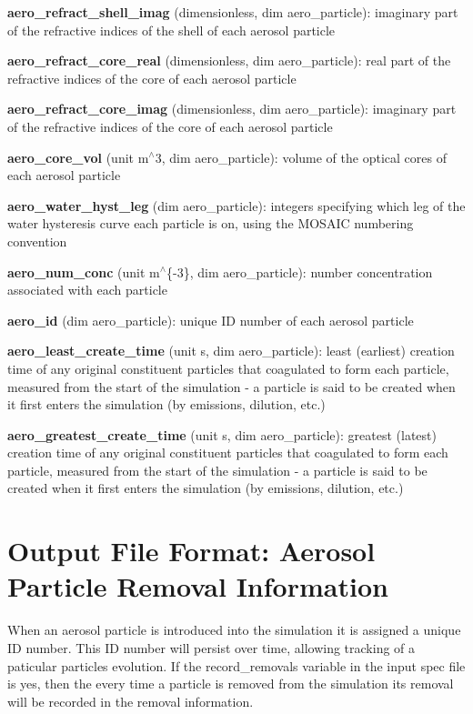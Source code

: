 \begin{DoxyItemize}
\item {\bfseries aero\+\_\+refract\+\_\+shell\+\_\+imag} (dimensionless, dim {\ttfamily aero\+\_\+particle})\+: imaginary part of the refractive indices of the shell of each aerosol particle
\item {\bfseries aero\+\_\+refract\+\_\+core\+\_\+real} (dimensionless, dim {\ttfamily aero\+\_\+particle})\+: real part of the refractive indices of the core of each aerosol particle
\item {\bfseries aero\+\_\+refract\+\_\+core\+\_\+imag} (dimensionless, dim {\ttfamily aero\+\_\+particle})\+: imaginary part of the refractive indices of the core of each aerosol particle
\item {\bfseries aero\+\_\+core\+\_\+vol} (unit m$^\wedge$3, dim {\ttfamily aero\+\_\+particle})\+: volume of the optical cores of each aerosol particle
\item {\bfseries aero\+\_\+water\+\_\+hyst\+\_\+leg} (dim {\ttfamily aero\+\_\+particle})\+: integers specifying which leg of the water hysteresis curve each particle is on, using the M\+O\+S\+A\+IC numbering convention
\item {\bfseries aero\+\_\+num\+\_\+conc} (unit m$^\wedge$\{-\/3\}, dim {\ttfamily aero\+\_\+particle})\+: number concentration associated with each particle
\item {\bfseries aero\+\_\+id} (dim {\ttfamily aero\+\_\+particle})\+: unique ID number of each aerosol particle
\item {\bfseries aero\+\_\+least\+\_\+create\+\_\+time} (unit s, dim {\ttfamily aero\+\_\+particle})\+: least (earliest) creation time of any original constituent particles that coagulated to form each particle, measured from the start of the simulation -\/ a particle is said to be created when it first enters the simulation (by emissions, dilution, etc.)
\item {\bfseries aero\+\_\+greatest\+\_\+create\+\_\+time} (unit s, dim {\ttfamily aero\+\_\+particle})\+: greatest (latest) creation time of any original constituent particles that coagulated to form each particle, measured from the start of the simulation -\/ a particle is said to be created when it first enters the simulation (by emissions, dilution, etc.) 
\end{DoxyItemize}\hypertarget{output_format_aero_removed}{}\section{Output File Format\+: Aerosol Particle Removal Information}\label{output_format_aero_removed}
When an aerosol particle is introduced into the simulation it is assigned a unique ID number. This ID number will persist over time, allowing tracking of a paticular particle\textquotesingle{}s evolution. If the {\ttfamily record\+\_\+removals} variable in the input spec file is {\ttfamily yes}, then the every time a particle is removed from the simulation its removal will be recorded in the removal information.

